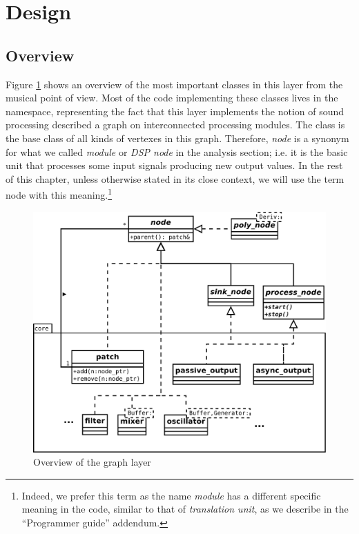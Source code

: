 \section{Design}

\subsection{Overview}

Figure \ref{fig:graphoverview} shows an overview of the most important
classes in this layer from the musical point of view. Most of the code
implementing these classes lives in the 
namespace, representing the fact that this layer implements the notion
of sound processing described a graph on interconnected processing
modules. The  class is the base class of all kinds of
vertexes in this graph. Therefore, \emph{node} is a synonym for what
we called \emph{module} or \emph{DSP node} in the analysis section;
i.e. it is the basic unit that processes some input signals producing
new output values. In the rest of this chapter, unless otherwise
stated in its close context, we will use the term node with this
meaning.\footnote{Indeed, we prefer this term as the name
  \emph{module} has a different specific meaning in the code, similar
  to that of \emph{translation unit}, as we describe in the
  ``Programmer guide'' addendum.}

\begin{figure}[h]
  \centering
  \includegraphics[width=\textwidth]{pic/graph-node.pdf}
  \caption{Overview of the graph layer}
  \label{fig:graphoverview}
\end{figure}


